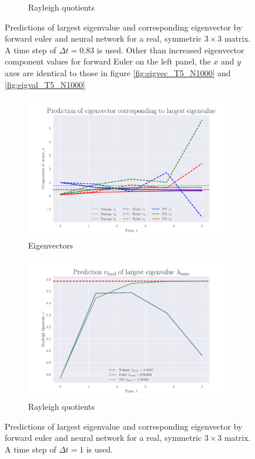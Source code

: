 \documentclass[12pt]{extarticle}
\begin{document}
\begin{figure}[h]
\begin{subfigure}{0.49\textwidth}
		\caption{Rayleigh quotients}
		\label{fig:eigval_T5_N6}
	\end{subfigure}
	\caption{Predictions of largest eigenvalue and corresponding eigenvector by forward euler and neural network for a real, symmetric $3\times 3$ matrix. A time step of $\Delta t = 0.83$ is used. Other than increased eigenvector component values for forward Euler on the left panel, the $x$ and $y$ axes are identical to those in figure \ref{fig:eigvec_T5_N1000} and \ref{fig:eigval_T5_N1000}}
	\label{fig:eig_T5_N6}
\end{figure}


\begin{figure}[h]
	
	\centering
	\begin{subfigure}{0.49\textwidth}
		\centering
		\includegraphics[width=\textwidth]{../output/plots/eigvec_T5_N5.pdf}
		\caption{Eigenvectors}
		\label{fig:eigvec_T5_N5}
	\end{subfigure}
	\hfill
	\begin{subfigure}{0.49\textwidth}
		\centering
		\includegraphics[width=\textwidth]{../output/plots/eigval_T5_N5.pdf}
		\caption{Rayleigh quotients}
		\label{fig:eigval_T5_N5}
	\end{subfigure}
	\caption{Predictions of largest eigenvalue and corresponding eigenvector by forward euler and neural network for a real, symmetric $3\times 3$ matrix. A time step of $\Delta t = 1$ is used.}
	\label{fig:eig_T5_N5}
\end{figure}
\end{document}
